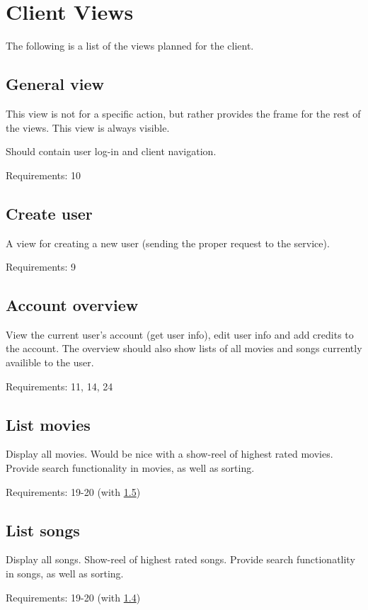 \section{Client Views}
\label{app:client-views}

The following is a list of the views planned for the client.

\subsection{General view}
This view is not for a specific action, but rather provides the frame for the rest
of the views. This view is always visible.

Should contain user log-in and client navigation.

Requirements: 10

\subsection{Create user}
A view for creating a new user (sending the proper request to the service).

Requirements: 9

\subsection{Account overview}
View the current user's account (get user info), edit user info and add credits to
the account. The overview should also show lists of all movies and songs currently
availible to the user.

Requirements: 11, 14, 24

\subsection{List movies}
\label{app:client-views-list-movies}
Display all movies. Would be nice with a show-reel of highest rated movies. Provide search
functionality in movies, as well as sorting.

Requirements: 19-20 (with \ref{app:client-views-list-songs})

\subsection{List songs}
\label{app:client-views-list-songs}
Display all songs. Show-reel of highest rated songs. Provide search functionatlity in songs,
as well as sorting.

Requirements: 19-20 (with \ref{app:client-views-list-movies})

